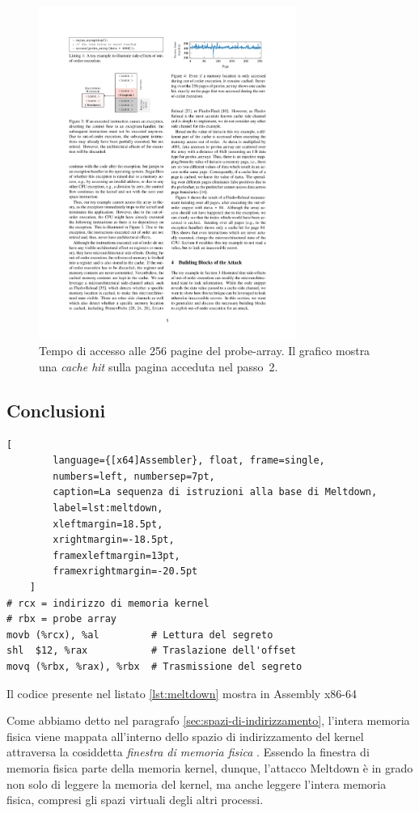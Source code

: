 \begin{figure}
	\centering
	\includegraphics[width=0.75\textwidth]{"img/probe-array.pdf"}
	\caption{Tempo di accesso alle 256 pagine del probe-array. Il grafico mostra una \emph{cache hit} sulla pagina acceduta nel passo~2.~\cite{lipp:meltdown}} %
	\label{fig:probe-array}
\end{figure}


\subsection{Conclusioni}

\begin{lstlisting}[
		language={[x64]Assembler}, float, frame=single,
		numbers=left, numbersep=7pt,
		caption=La sequenza di istruzioni alla base di Meltdown,
		label=lst:meltdown,
		xleftmargin=18.5pt,
		xrightmargin=-18.5pt,
		framexleftmargin=13pt,
		framexrightmargin=-20.5pt
	]
# rcx = indirizzo di memoria kernel
# rbx = probe array
movb (%rcx), %al         # Lettura del segreto
shl  $12, %rax           # Traslazione dell'offset
movq (%rbx, %rax), %rbx  # Trasmissione del segreto
\end{lstlisting}

Il codice presente nel listato \ref{lst:meltdown} mostra in Assembly x86-64


Come abbiamo detto nel paragrafo \ref{sec:spazi-di-indirizzamento}, l'intera memoria fisica viene mappata all'interno dello spazio di indirizzamento del kernel attraversa la cosiddetta \emph{finestra di memoria fisica} \cite{lettieri:paginazione-complementi}.
Essendo la finestra di memoria fisica parte della memoria kernel, dunque, l'attacco Meltdown è in grado non solo di leggere la memoria del kernel, ma anche leggere l'intera memoria fisica, compresi gli spazi virtuali degli altri processi.


